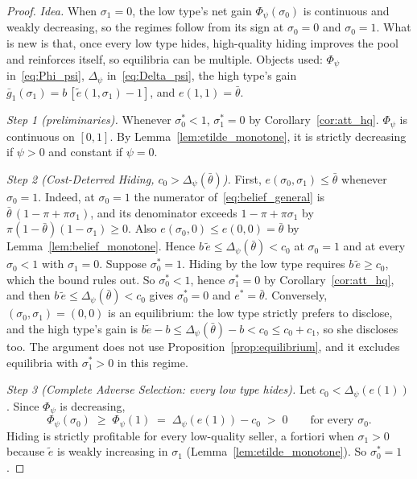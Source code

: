 \begin{proof}\upshape
\emph{Idea.} When $\sigma_1=0$, the low type's net gain $\Phi_\psi(\sigma_0)$ is continuous and weakly decreasing, so the regimes follow from its sign at $\sigma_0=0$ and $\sigma_0=1$. What is new is that, once every low type hides, high-quality hiding improves the pool and reinforces itself, so equilibria can be multiple. Objects used: $\Phi_\psi$ in~\eqref{eq:Phi_psi}, $\Delta_\psi$ in~\eqref{eq:Delta_psi}, the high type's gain $\bar g_1(\sigma_1)=b\,[\tilde e(1,\sigma_1)-1]$, and $e(1,1)=\bar\theta$.

\emph{Step 1 (preliminaries).} Whenever $\sigma_0^*<1$, $\sigma_1^*=0$ by Corollary~\ref{cor:att_hq}. $\Phi_\psi$ is continuous on $[0,1]$. By Lemma~\ref{lem:etilde_monotone}, it is strictly decreasing if $\psi>0$ and constant if $\psi=0$.

\emph{Step 2 (Cost-Deterred Hiding, $c_0>\Delta_\psi(\bar\theta)$).} First, $e(\sigma_0,\sigma_1)\le\bar\theta$ whenever $\sigma_0=1$. Indeed, at $\sigma_0=1$ the numerator of~\eqref{eq:belief_general} is $\bar\theta\,(1-\pi+\pi\sigma_1)$, and its denominator exceeds $1-\pi+\pi\sigma_1$ by $\pi(1-\bar\theta)(1-\sigma_1)\ge0$. Also $e(\sigma_0,0)\le e(0,0)=\bar\theta$ by Lemma~\ref{lem:belief_monotone}. Hence $b\,\tilde e\le\Delta_\psi(\bar\theta)<c_0$ at $\sigma_0=1$ and at every $\sigma_0<1$ with $\sigma_1=0$. Suppose $\sigma_0^*=1$. Hiding by the low type requires $b\,\tilde e\ge c_0$, which the bound rules out. So $\sigma_0^*<1$, hence $\sigma_1^*=0$ by Corollary~\ref{cor:att_hq}, and then $b\,\tilde e\le\Delta_\psi(\bar\theta)<c_0$ gives $\sigma_0^*=0$ and $e^*=\bar\theta$. Conversely, $(\sigma_0,\sigma_1)=(0,0)$ is an equilibrium: the low type strictly prefers to disclose, and the high type's gain is $b\tilde e-b\le\Delta_\psi(\bar\theta)-b<c_0\le c_0+c_1$, so she discloses too. The argument does not use Proposition~\ref{prop:equilibrium}, and it excludes equilibria with $\sigma_1^*>0$ in this regime.

\emph{Step 3 (Complete Adverse Selection: every low type hides).} Let $c_0<\Delta_\psi(e(1))$. Since $\Phi_\psi$ is decreasing,
\begin{equation*}
    \Phi_\psi(\sigma_0)\;\ge\;\Phi_\psi(1)\;=\;\Delta_\psi(e(1))-c_0\;>\;0\qquad\text{for every }\sigma_0 .
\end{equation*}
Hiding is strictly profitable for every low-quality seller, a fortiori when $\sigma_1>0$ because $\tilde e$ is weakly increasing in $\sigma_1$ (Lemma~\ref{lem:etilde_monotone}). So $\sigma_0^*=1$.


\end{proof}
